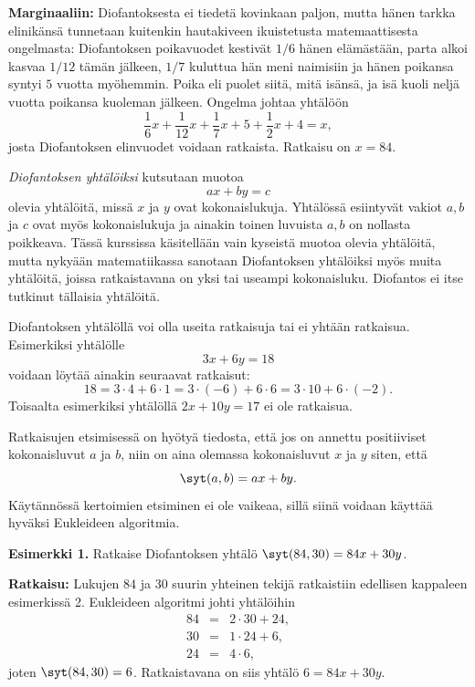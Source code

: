 {\bf Marginaaliin:}
Diofantoksesta ei tiedetä kovinkaan paljon, mutta hänen tarkka \hbox{elin}\-ikän\-sä tunnetaan kuitenkin hautakiveen ikuistetusta matemaattisesta ongelmasta: Diofantoksen poikavuodet kestivät $1/6$ hänen elämästään, parta alkoi kasvaa $1/12$ tämän jälkeen, $1/7$ kuluttua hän meni naimisiin ja hänen poikansa syntyi $5$ vuotta myöhemmin. Poika eli puolet siitä, mitä isänsä, ja isä kuoli neljä vuotta poikansa kuoleman jälkeen. Ongelma johtaa yhtälöön
\[
\frac{1}{6}x + \frac{1}{12} x + \frac{1}{7}x + 5 + \frac{1}{2}x+ 4=x,
\]
josta Diofantoksen elinvuodet voidaan ratkaista. Ratkaisu on $x=84$.

{\em Diofantoksen yhtälöiksi} kutsutaan muotoa
\[
ax + by = c
\]
olevia yhtälöitä, missä $x$ ja $y$ ovat kokonaislukuja. Yhtälössä esiintyvät vakiot $a,b$ ja $c$ ovat myös kokonaislukuja ja ainakin toinen luvuista $a,b$ on nollasta poikkeava. 
Tässä kurssissa käsitellään vain kyseistä muotoa olevia yhtälöitä, mutta nykyään matematiikassa sanotaan Diofantoksen yhtälöiksi myös muita yhtälöitä, joissa ratkaistavana on yksi tai useampi kokonaisluku. Diofantos ei itse tutkinut tällaisia yhtälöitä.

Diofantoksen yhtälöllä voi olla useita ratkaisuja tai ei yhtään ratkaisua. Esimerkiksi
yhtälölle
\[
3x + 6 y = 18
\]
voidaan löytää ainakin seuraavat ratkaisut:
\[
18 = 3\cdot 4 + 6\cdot 1 = 3\cdot (-6)+6\cdot 6 = 3\cdot10 + 6\cdot (-2).
\]
Toisaalta esimerkiksi yhtälöllä $2x+10 y =17$ ei ole ratkaisua.

Ratkaisujen etsimisessä on hyötyä tiedosta, että jos on annettu positiiviset kokonaisluvut $a$ ja $b$, niin on aina olemassa kokonaisluvut $x$ ja $y$ siten, että
\[
\syt(a,b) = ax + by.
\]
Käytännössä kertoimien etsiminen ei ole vaikeaa, sillä siinä voidaan käyttää hyväksi Eukleideen algoritmia.

{\bf Esimerkki 1.} Ratkaise Diofantoksen yhtälö
$\syt(84,30) = 84x + 30y$.

{\bf Ratkaisu:} Lukujen $84$ ja $30$ suurin yhteinen tekijä
ratkaistiin edellisen kappaleen esimerkissä 2. Eukleideen
algoritmi johti yhtälöihin
\begin{eqnarray*}
84 &=& 2 \cdot 30 + 24,\\
30 &=& 1 \cdot 24 + 6,\\
24 &=& 4 \cdot 6,
\end{eqnarray*}
joten $\syt(84,30) = 6$. Ratkaistavana on siis yhtälö $6
= 84x + 30y$.

